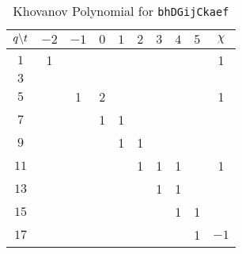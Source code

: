 \begin{table}
    \centering
    \begin{tabular}{| c | c | c | c | c | c | c | c | c | c |}
        \hline
        $q\symbol{92}t$&$-2$&$-1$&$0$&$1$&$2$&$3$&$4$&$5$&$\chi$\\
        \hline
        $1$&1&&&&&&&&1\\
        \hline
        $3$&&&&&&&&&\\
        \hline
        $5$&&1&2&&&&&&1\\
        \hline
        $7$&&&1&1&&&&&\\
        \hline
        $9$&&&&1&1&&&&\\
        \hline
        $11$&&&&&1&1&1&&1\\
        \hline
        $13$&&&&&&1&1&&\\
        \hline
        $15$&&&&&&&1&1&\\
        \hline
        $17$&&&&&&&&1&$-1$\\
        \hline
    \end{tabular}
    \caption{Khovanov Polynomial for \texttt{bhDGijCkaef}}
    \label{table:bhDGijCkaef_kho}
\end{table}

